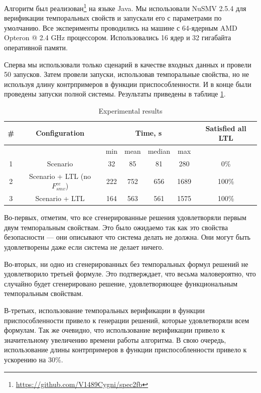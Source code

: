 \documentclass[14pt]{extarticle}
\theoremstyle{plain}
\theoremstyle{definition}
\begin{document}
Алгоритм был реализован\footnote{\url{https://github.com/V1489Cygni/spec2fb}} на языке Java.
Мы использовали NuSMV 2.5.4 для верификации
темпоральных свойств и запускали его с параметрами по умолчанию. Все эксперименты
проводились на машине с 64-ядерным AMD Opteron @ 2.4 GHz процессором.
Использовались 16 ядер и 32 гигабайта оперативной памяти.

Сперва мы использовали только сценарий в качестве входных данных и провели 50 запусков.
Затем провели запуски, использовав темпоральные свойства, но не используя длину
контрпримеров в функции приспособленности. И в конце были проведены запуски полной
системы. Результаты приведены в таблице \ref{results-table}.

\begin{table}[t]
\centering
\caption{Experimental results}
\label{results-table}
\begin{tabular}{c|c|c|c|c|c|c}
\hline
\# & Configuration & \multicolumn{4}{c|}{Time, s} & Satisfied all LTL\\
\hline
 &              & min & mean & median & max & \\
\hline
1 & Scenario                           & 32       & 85        & 81          & 280  & 0\%\\
2 & Scenario + LTL (no $F_{smv}^{ce}$) & 222      & 752       & 656         & 1689 & 100\%\\   
3 & Scenario + LTL                     & 164      & 563       & 561         & 1575 & 100\%\\
\hline
\end{tabular}
\end{table}

Во-первых, отметим, что все сгенерированные решения удовлетворяли первым двум
темпоральным свойствам. Это было ожидаемо так как это свойства безопасности ---
они описывают что система делать не должна. Они могут быть удовлетворены даже
если система не делает ничего.

Во-вторых, ни одно из сгенерированных без темпоральных формул решений не удовлетворило
третьей формуле. Это подтверждает, что весьма маловероятно, что случайно будет
сгенерировано решение, удовлетворяющее функциональным темпоральным свойствам.

В-третьих, использование темпоральных верификации в функции приспособленности привело
к генерации решений, которые удовлетворяли всем формулам. Так же очевидно, что использование
верификации привело к значительному увеличению времени работы алгоритма. В свою очередь,
использование длины контрпримеров в функции приспособленности привело к ускорению на 30\%.
\end{document}
